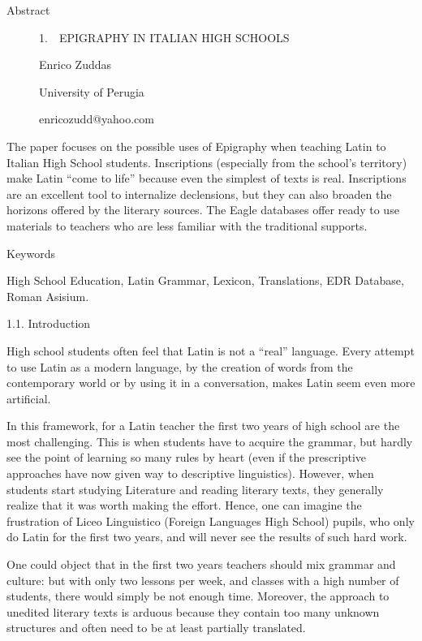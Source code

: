 \documentclass[amsthm,ebook]{saparticle}
\title{}
\author{Utente}
\date{2015-11-16}
\begin{document}
Abstract

\begin{figure}
\centering
\begin{minipage}{10.901cm}
1.\ \ EPIGRAPHY IN ITALIAN HIGH SCHOOLS\newline


Enrico Zuddas

University of Perugia

enricozudd@yahoo.com
\end{minipage}
\end{figure}
The paper focuses on the possible uses of Epigraphy when teaching Latin to Italian High School students. Inscriptions
(especially from the school’s territory) make Latin “come to life” because even the simplest of texts is real.
Inscriptions are an excellent tool to internalize declensions, but they can also broaden the horizons offered by the
literary sources. The Eagle databases offer ready to use materials to teachers who are less familiar with the
traditional supports.

Keywords

High School Education, Latin Grammar, Lexicon, Translations, EDR Database, Roman Asisium.


\bigskip

1.1. Introduction

High school students often feel that Latin is not a “real” language. Every attempt to use Latin as a modern language, by
the creation of words from the contemporary world or by using it in a conversation, makes Latin seem even more
artificial.

In this framework, for a Latin teacher the first two years of high school are the most challenging. This is when
students have to acquire the grammar, but hardly see the point of learning so many rules by heart (even if the
prescriptive approaches have now given way to descriptive linguistics). However, when students start studying
Literature and reading literary texts, they generally realize that it was worth making the effort. Hence, one can
imagine the frustration of Liceo Linguistico (Foreign Languages High School) pupils, who only do Latin for the first
two years, and will never see the results of such hard work.

One could object that in the first two years teachers should mix grammar and culture: but with only two lessons per
week, and classes with a high number of students, there would simply be not enough time. Moreover, the approach to
unedited literary texts is arduous because they contain too many unknown structures and often need to be at least
partially translated.
\end{document}
